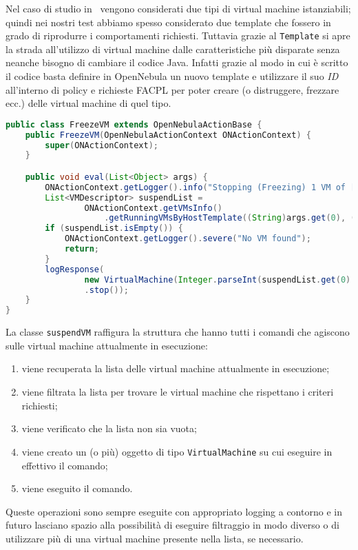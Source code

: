 Nel caso di studio in~\cite{10.1007/978-3-319-08260-8_6} vengono considerati due tipi di virtual machine istanziabili; quindi nei nostri test abbiamo spesso considerato due template che fossero in grado di riprodurre i comportamenti richiesti. Tuttavia grazie al \texttt{Template} si apre la strada all'utilizzo di virtual machine dalle caratteristiche più disparate senza neanche bisogno di cambiare il codice Java. Infatti grazie al modo in cui è scritto il codice basta definire in OpenNebula un nuovo template e utilizzare il suo \emph{ID} all'interno di policy e richieste FACPL per poter creare (o distruggere, frezzare ecc.) delle virtual machine di quel tipo.
\begin{lstlisting}[language=Java, caption=Classe per freezzare una \texttt{VirtualMachine}, label=code:FreezeVM, basicstyle=\fontsize{8.5}{9.5}\ttfamily]
public class FreezeVM extends OpenNebulaActionBase {
    public FreezeVM(OpenNebulaActionContext ONActionContext) {
        super(ONActionContext);
    }

    public void eval(List<Object> args) {
        ONActionContext.getLogger().info("Stopping (Freezing) 1 VM of [host, template]: " + "[" + args.get(0) + " " + args.get(2) + "]");
        List<VMDescriptor> suspendList = 
                ONActionContext.getVMsInfo()
                    .getRunningVMsByHostTemplate((String)args.get(0), (String)args.get(2));
        if (suspendList.isEmpty()) {
            ONActionContext.getLogger().severe("No VM found");
            return;
        }
        logResponse(
                new VirtualMachine(Integer.parseInt(suspendList.get(0).getVmId()), ONActionContext.getClient())
                .stop());
    }
}
\end{lstlisting}
La classe \texttt{suspendVM} raffigura la struttura che hanno tutti i comandi che agiscono sulle virtual machine attualmente in esecuzione:
\begin{enumerate}
    \item viene recuperata la lista delle virtual machine attualmente in esecuzione;
    \item viene filtrata la lista per trovare le virtual machine che rispettano i criteri richiesti;
    \item viene verificato che la lista non sia vuota;
    \item viene creato un (o più) oggetto di tipo \texttt{VirtualMachine} su cui eseguire in effettivo il comando;
    \item viene eseguito il comando.
\end{enumerate}
Queste operazioni sono sempre eseguite con appropriato logging a contorno e in futuro lasciano spazio alla possibilità di eseguire filtraggio in modo diverso o di utilizzare più di una virtual machine presente nella lista, se necessario.

